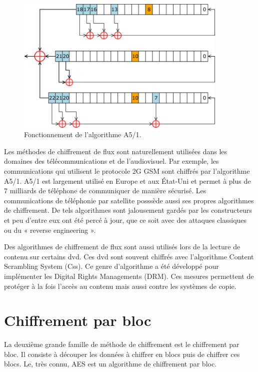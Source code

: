	\begin{figure}[!h]
		\centering
		\includegraphics[width=0.9\textwidth]{imgs/application/A5.png}
		\caption{Fonctionnement de l'algorithme A5/1.}
		\label{algoA5}
	\end{figure}

	Les méthodes de chiffrement de flux sont naturellement utilisées dans les
	domaines des télécommunications et de l'audiovisuel. Par exemple, les
	communications qui utilisent le protocole 2G GSM sont chiffrés par
	l'algorithme A5/1. A5/1 est largement utilisé en Europe et aux État-Uni et
	permet à plus de 7 milliards de téléphone de communiquer de manière
	sécurisé\cite{7milliards}. Les communications de téléphonie par satellite
	posssède aussi ses propres algorithmes de chiffrement. De tels algorithmes
	sont jalousement gardés par les constructeurs et peu d'entre eux ont été percé à
	jour, que ce soit avec des attaques classiques ou du « reverse engineering ».

	Des algorithmes de chiffrement de flux sont aussi utilisés lors de la lecture
	de contenu sur certains dvd. Ces dvd sont souvent chiffrés avec l'algorithme
	Content Scrambling System (Css). Ce genre d'algorithme a été développé pour
	implémenter les Digital Rights Managements (DRM). Ces mesures permettent de
	protéger à la fois l'accès au contenu mais aussi contre les systèmes de copie.
	\section{Chiffrement par bloc}

	La deuxième grande famille de méthode de chiffrement est le chiffrement par
	bloc. Il consiste à découper les données à chiffrer en blocs puis de chiffrer
	ces blocs. Le, très connu, AES est un algorithme de chiffrement par bloc.

